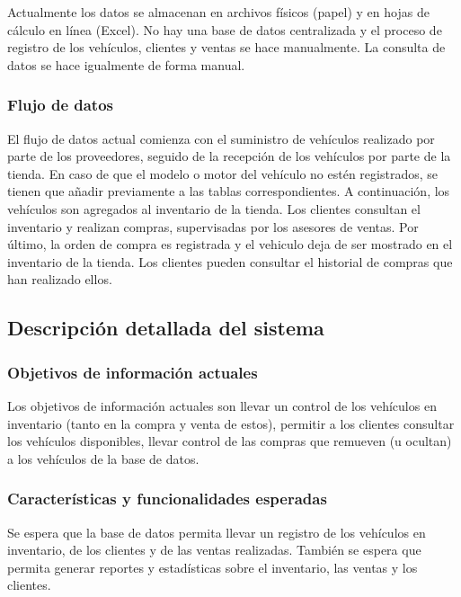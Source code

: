 \documentclass[12pt]{article}
\begin{document}
Actualmente los datos se almacenan en archivos físicos (papel) y en hojas de cálculo en línea (Excel). No hay una base de datos centralizada y el proceso de registro de los vehículos, clientes y ventas se hace manualmente. La consulta de datos se hace igualmente de forma manual.

\subsubsection{Flujo de datos}

El flujo de datos actual comienza con el suministro de vehículos realizado por parte de los proveedores, seguido de la recepción de los vehículos por parte de la tienda. En caso de que el modelo o motor del vehículo no estén registrados, se tienen que añadir previamente a las tablas correspondientes. A continuación, los vehículos son agregados al inventario de la tienda. Los clientes consultan el inventario y realizan compras, supervisadas por los asesores de ventas. Por último, la orden de compra es registrada y el vehiculo deja de ser mostrado en el inventario de la tienda. Los clientes pueden consultar el historial de compras que han realizado ellos.

\subsection{Descripci\'on detallada del sistema}

\subsubsection{Objetivos de información actuales}

Los objetivos de información actuales son llevar un control de los vehículos en inventario (tanto en la compra y venta de estos), permitir a los clientes consultar los vehículos disponibles, llevar control de las compras que remueven (u ocultan) a los vehículos de la base de datos.

\subsubsection{Caracter\'isticas y funcionalidades esperadas}

Se espera que la base de datos permita llevar un registro de los vehículos en inventario, de los clientes y de las ventas realizadas. También se espera que permita generar reportes y estadísticas sobre el inventario, las ventas y los clientes.
\end{document}
